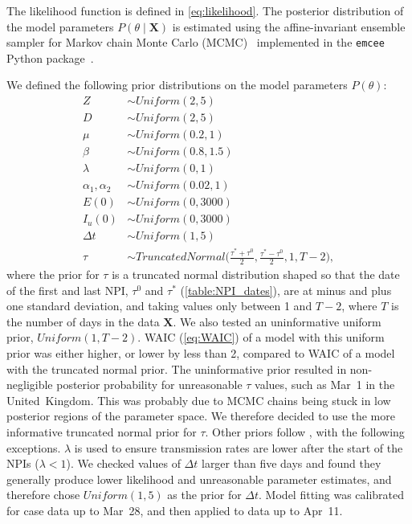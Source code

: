 \documentclass[12pt]{extarticle}
\let\vec\mathbf
\begin{document}
{The likelihood function is defined in \autoref{eq:likelihood}.
The posterior distribution of the model parameters $P(\theta \mid \vec{X})$ is estimated using the affine-invariant ensemble sampler for Markov chain Monte Carlo (MCMC)~\citep{Goodman2010} implemented in the \texttt{emcee} Python package~\citep{Foreman-Mackey2013}.

We defined the following prior distributions on the model parameters $P(\theta)$: 
\begin{equation} \label{eq:priors}
\begin{aligned} 
Z & \sim \mathit{Uniform}(2, 5) \\
D & \sim \mathit{Uniform}(2, 5) \\
\mu & \sim \mathit{Uniform}(0.2, 1) \\
\beta & \sim \mathit{Uniform}(0.8, 1.5) \\
\lambda & \sim \mathit{Uniform}(0, 1) \\
\alpha_1, \alpha_2 & \sim \mathit{Uniform}(0.02, 1)\\
E(0) & \sim \mathit{Uniform}(0, 3000) \\
I_u(0) & \sim \mathit{Uniform}(0, 3000) \\
\Delta t & \sim \mathit{Uniform}(1, 5) \\
\tau &\sim \mathit{TruncatedNormal}\Big(\frac{\tau^*+\tau^0}{2}, \frac{\tau^*-\tau^0}{2}, 1, T-2\Big),
\end{aligned}
\end{equation}
where the prior for $\tau$ is a truncated normal distribution shaped so that the date of the first and last NPI, $\tau^0$ and $\tau^*$ (\autoref{table:NPI_dates}), are at minus and plus one standard deviation, and taking values only between 1 and  $T-2$, where $T$ is the number of days in the data $\vec{X}$.
We also tested an uninformative uniform prior, $\mathit{Uniform}(1,T-2)$.
WAIC (\autoref{eq:WAIC}) of a model with this uniform prior was either higher, or lower by less than 2, compared to WAIC of a model with the truncated normal prior.
The uninformative prior resulted in non-negligible posterior probability for unreasonable $\tau$ values, such as Mar~1 in the United~Kingdom. This was probably due to MCMC chains being stuck in low posterior regions of the parameter space.
We therefore decided to use the more informative truncated normal prior for $\tau$.
Other priors follow \citet{Li2020}, with the following exceptions.
$\lambda$ is used to ensure transmission rates are lower after the start of the NPIs ($\lambda < 1$).
We checked values of $\Delta t$ larger than five days and found they generally produce lower likelihood and unreasonable parameter estimates, and therefore chose $\mathit{Uniform}(1,5)$ as the prior for $\Delta t$.
Model fitting was calibrated for case data up to Mar~28, and then applied to data up to Apr~11.



}
\end{document}
